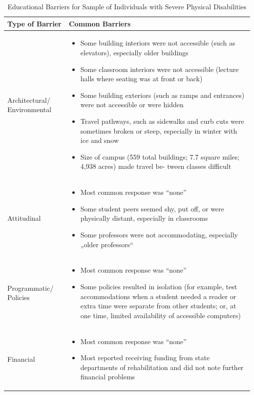 \documentclass[11.5pt]{sig-alternate} %
\begin{document}
\begin{large}
\begin{table}[t]
\caption{Educational Barriers for Sample of Individuals with Severe Physical Disabilities}
\begin{tabular}{|l|l|}
\hline
Type of Barrier & Common Barriers \\ \hline
Architectural/ Environmental &
\begin{itemize}[noitemsep, topsep=0pt, leftmargin=*]
\item Some building interiors were not accessible (such as elevators), especially older buildings
\item Some classroom interiors were not accessible (lecture halls where seating was at front or back)
\item Some building exteriors (such as ramps and entrances) were not accessible or were hidden
\item Travel pathways, such as sidewalks and curb cuts were sometimes broken or steep, especially in winter with ice and snow
\item Size of campus (559 total buildings; 7.7 square miles; 4,938 acres) made travel be- tween classes difficult
\end{itemize} \\ \hline
Attitudinal & 
\begin{itemize}[noitemsep, topsep=0pt, leftmargin=*]
\item Most common response was “none”
\item Some student peers seemed shy, put off, or were physically distant, especially in classrooms
\item Some professors were not accommodating, especially „older professors``
\end{itemize} \\ \hline
Programmatic/ Policies &
\begin{itemize}[noitemsep, topsep=0pt, leftmargin=*]
\item Most common response was “none”
\item Some policies resulted in isolation (for example, test accommodations when a student needed a reader or extra time were separate from other students; or, at one time, limited availability of accessible computers)
\end{itemize} \\ \hline
Financial &
\begin{itemize}[noitemsep, topsep=0pt, leftmargin=*]
\item Most common response was “none”
\item Most reported receiving funding from state departments of rehabilitation and did not note further financial problems

\end{itemize}
\end{tabular}
\end{table}
\end{large}
\end{document}

